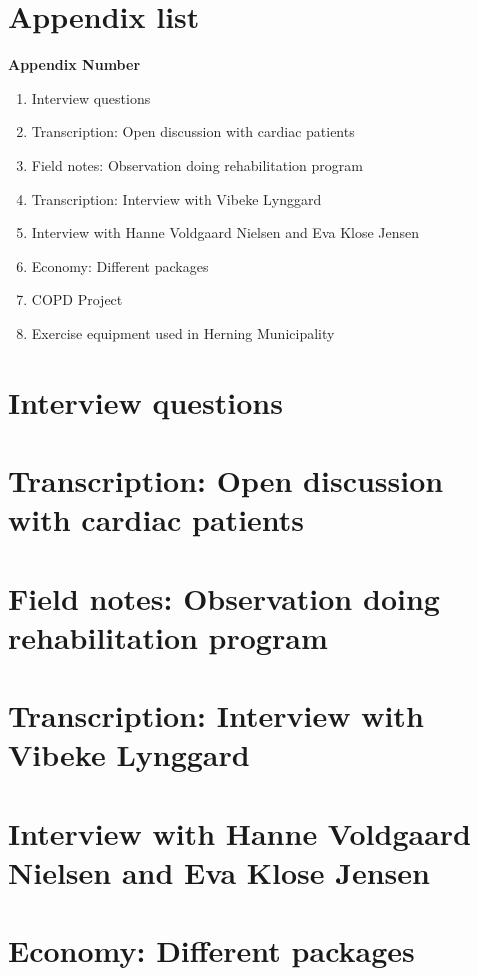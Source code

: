 \chapter{Appendix list}

\textbf{Appendix Number}
\begin{enumerate}
	\item Interview questions
	\item Transcription: Open discussion with cardiac patients
	\item Field notes: Observation doing rehabilitation program
	\item Transcription: Interview with Vibeke Lynggard
	\item Interview with Hanne Voldgaard Nielsen and Eva Klose Jensen
	\item Economy: Different packages
	\item COPD Project
	\item Exercise equipment used in Herning Municipality
\end{enumerate}



\chapter{Interview questions} \label{interviewquestion}

\chapter{Transcription: Open discussion with cardiac patients}

\chapter{Field notes: Observation doing rehabilitation program}

\chapter{Transcription: Interview with Vibeke Lynggard}

\chapter{Interview with Hanne Voldgaard Nielsen and Eva Klose Jensen}

\chapter{Economy: Different packages} \label{economics}

